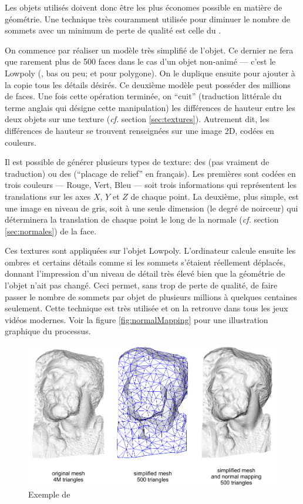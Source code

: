Les objets utilisés doivent donc être les plus économes possible en matière de géométrie. Une technique très couramment utilisée pour diminuer le nombre de sommets avec un minimum de perte de qualité est celle du .

On commence par réaliser un modèle très simplifié de l'objet. Ce dernier ne fera que rarement plus de 500 faces dans le cas d'un objet non-animé --- c'est le Lowpoly (, bas ou peu; et  pour polygone). On le duplique ensuite pour ajouter à la copie tous les détails désirés. Ce deuxième modèle peut posséder des millions de faces. Une fois cette opération terminée, on \enquote{cuit} (traduction littérale du terme anglais  qui désigne cette manipulation) les différences de hauteur entre les deux objets sur une texture (\textit{cf.} section \ref{sec:textures}). Autrement dit, les différences de hauteur se trouvent renseignées sur une image 2D, codées en couleurs.

Il est possible de générer plusieurs types de texture: des  (pas vraiment de traduction) ou des  (\enquote{placage de relief} en français). Les premières sont codées en trois couleurs --- Rouge, Vert, Bleu --- soit trois informations qui représentent les translations sur les axes $X$, $Y$ et $Z$ de chaque point. La deuxième, plus simple, est une image en niveau de gris, soit à une seule dimension (le degré de noirceur) qui déterminera la translation de chaque point le long de la normale (\textit{cf.} section \ref{sec:normales}) de la face.

Ces textures sont appliquées sur l'objet Lowpoly. L'ordinateur calcule ensuite les ombres et certains détails comme si les sommets s'étaient réellement déplacés, donnant l'impression d'un niveau de détail très élevé bien que la géométrie de l'objet n'ait pas changé. Ceci permet, sans trop de perte de qualité, de faire passer le nombre de sommets par objet de plusieurs millions à quelques centaines seulement. Cette technique est très utilisée et on la retrouve dans tous les jeux vidéos modernes. Voir la figure \ref{fig:normalMapping} pour une illustration graphique du processus.

\begin{figure}[th!]
	\center
	\includegraphics[width=.8\textwidth]{images/Technique/Normal_map_example.png}
	\caption{Exemple de  {\cite{Normalmappingusedtoredetailsimplifiedmeshes_}}}
\end{figure}


